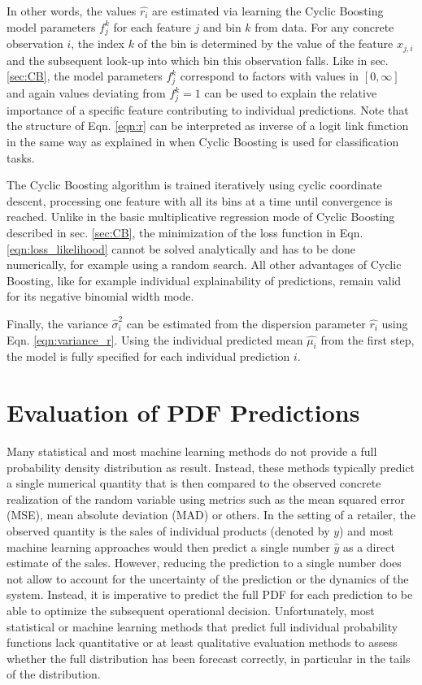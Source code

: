 \documentclass[BCOR=1mm, DIV=calc,10pt,
twoside=true,
twocolumn,
headings=normal]{scrartcl}
\newcommand{\eqn}{Eqn. }
\begin{document}
In other words, the values $\hat{r_i}$ are estimated via learning the Cyclic Boosting model parameters $f^k_j$ for each feature $j$ and bin $k$ from data. For any concrete observation $i$, the index $k$ of the bin is determined by the value of the feature $x_{j,i}$ and the subsequent look-up into which bin this observation falls. Like in sec. \ref{sec:CB}, the model parameters $f^k_j$ correspond to factors with values in $[0, \infty]$ and again values deviating from $f^k_j=1$ can be used to explain the relative importance of a specific feature contributing to individual predictions. Note that the structure of \eqn \eqref{eqn:r} can be interpreted as inverse of a logit link function in the same way as explained in  \cite{Wick2019} when Cyclic Boosting is used for classification tasks.

The Cyclic Boosting algorithm is trained iteratively using cyclic coordinate descent, processing one feature with all its bins at a time until convergence is reached. Unlike in the basic multiplicative regression mode of Cyclic Boosting described in sec. \ref{sec:CB}, the minimization of the loss function in \eqn \eqref{eqn:loss_likelihood} cannot be solved analytically and has to be done numerically, for example using a random search. All other advantages of Cyclic Boosting, like for example individual explainability of predictions, remain valid for its negative binomial width mode.

Finally, the variance $\hat{\sigma}^2_i$ can be estimated from the dispersion parameter $\hat{r_i}$ using \eqn \eqref{eqn:variance_r}. Using  the individual predicted mean $\hat{\mu_i}$ from the first step, the model is fully specified for each individual prediction $i$.


\section{Evaluation of PDF Predictions}
\label{sec:pdfEvaluation}

Many statistical and most machine learning methods do not provide a full probability density distribution as result. Instead, these methods typically predict a single numerical quantity that is then compared to the observed concrete realization of the random variable using metrics such as the mean squared error (MSE),  mean absolute deviation (MAD) or others. In the setting of a retailer, the observed quantity is the sales of individual products (denoted by $y$) and most machine learning approaches would then predict a single number $\hat{y}$ as a direct estimate of the sales. However, reducing the prediction to a single number does not allow to account for the uncertainty of the prediction or the dynamics of the system. Instead, it is imperative to predict the full PDF for each prediction to be able to optimize the subsequent operational decision. Unfortunately, most statistical or machine learning methods that predict full individual probability functions lack quantitative or at least qualitative evaluation methods to assess whether the full distribution has been forecast correctly, in particular in the tails of the distribution.
\end{document}
